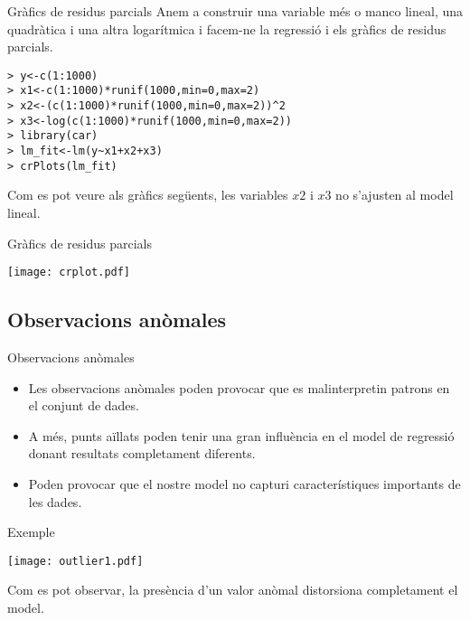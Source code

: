 \documentclass[12pt,t]{beamer}
\theoremstyle{plain}
\theoremstyle{definition}
\begin{document}
\begin{frame}[fragile]{Gràfics de residus parcials}
Anem a construir una variable més o manco lineal, una quadràtica i una altra logarítmica i facem-ne la regressió i els gràfics de residus parcials.

\begin{verbatim}
> y<-c(1:1000)
> x1<-c(1:1000)*runif(1000,min=0,max=2)
> x2<-(c(1:1000)*runif(1000,min=0,max=2))^2
> x3<-log(c(1:1000)*runif(1000,min=0,max=2))
> library(car)
> lm_fit<-lm(y~x1+x2+x3)
> crPlots(lm_fit)
\end{verbatim}

Com es pot veure als gràfics següents, les variables $x2$ i $x3$ no s'ajusten al model lineal. 

\end{frame}

\begin{frame}[fragile]{Gràfics de residus parcials}
\begin{center}
\texttt{[image: crplot.pdf]}
\end{center}
\end{frame}

\subsection{Observacions anòmales}
\begin{frame}{Observacions anòmales}
\begin{itemize}
\item Les observacions anòmales poden provocar que es malinterpretin patrons en el conjunt de dades.
\item A més, punts aïllats poden tenir una gran influència en el model de regressió donant resultats completament diferents.
\item Poden provocar que el nostre model no capturi característiques importants de les dades.
\end{itemize}
\end{frame}

\begin{frame}{Exemple}
\begin{center}
\texttt{[image: outlier1.pdf]}
\end{center}

Com es pot observar, la presència d'un valor anòmal distorsiona completament el model.

\end{frame}
\end{document}
